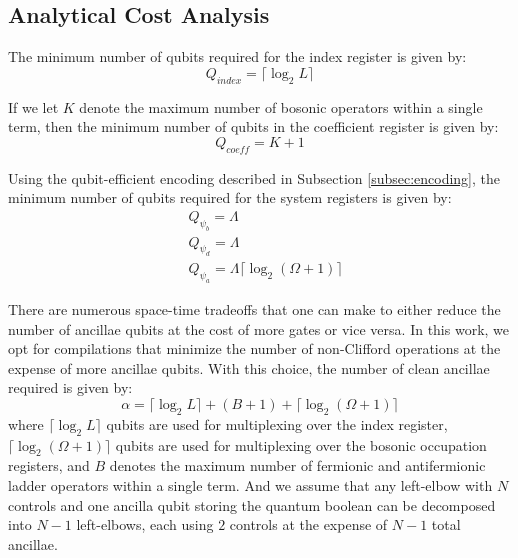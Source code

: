 \subsection{Analytical Cost Analysis}
\label{subsec:analytics}

The minimum number of qubits required for the index register is given by:
\begin{equation}
    Q_{\textit{index}} = \lceil \log_2{L} \rceil
\end{equation}

If we let $K$ denote the maximum number of bosonic operators within a single term, then the minimum number of qubits in the coefficient register is given by:
\begin{equation}
    Q_{\textit{coeff}} = K + 1
\end{equation} 

Using the qubit-efficient encoding described in Subsection \ref{subsec:encoding}, the minimum number of qubits required for the system registers is given by:
\begin{equation}
    \begin{split}
        &Q_{\psi_b} = \Lambda \\
        &Q_{\psi_d} = \Lambda \\
        &Q_{\psi_a} = \Lambda \lceil \log_2{(\Omega + 1)} \rceil
    \end{split}
\end{equation} 

There are numerous space-time tradeoffs that one can make to either reduce the number of ancillae qubits at the cost of more gates or vice versa.
In this work, we opt for compilations that minimize the number of non-Clifford operations at the expense of more ancillae qubits.
With this choice, the number of clean ancillae required is given by:
\begin{equation}
    \alpha = \lceil \log_2{L} \rceil + (B + 1) + \lceil \log_2{(\Omega + 1)} \rceil
\end{equation}
where $\lceil \log_2{L} \rceil$ qubits are used for multiplexing over the index register, $ \lceil \log_2{(\Omega + 1)} \rceil$ qubits are used for multiplexing over the bosonic occupation registers, and $B$ denotes the maximum number of fermionic and antifermionic ladder operators within a single term.
And we assume that any left-elbow with $N$ controls and one ancilla qubit storing the quantum boolean can be decomposed into $N-1$ left-elbows, each using $2$ controls at the expense of $N-1$ total ancillae.

